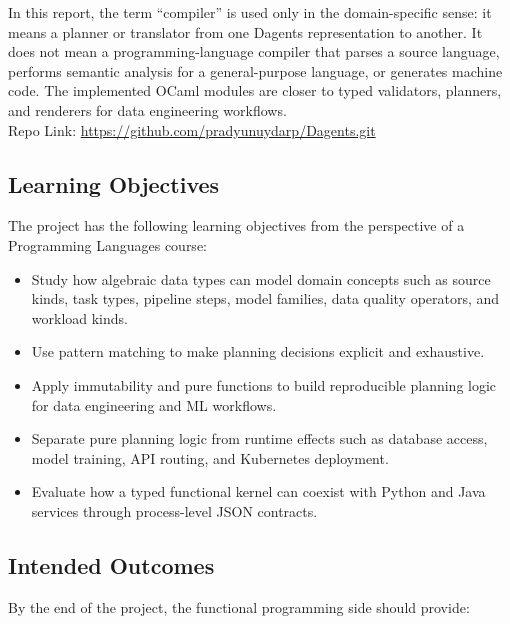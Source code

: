 \documentclass[conference]{IEEEtran}
\begin{document}
In this report, the term ``compiler'' is used only in the domain-specific sense:
it means a planner or translator from one Dagents representation to another.
It does not mean a programming-language compiler that parses a source language,
performs semantic analysis for a general-purpose language, or generates machine
code. The implemented OCaml modules are closer to typed validators, planners,
and renderers for data engineering workflows. \\

Repo Link: \url{https://github.com/pradyunuydarp/Dagents.git}

\subsection{Learning Objectives}

The project has the following learning objectives from the perspective of a
Programming Languages course:

\begin{itemize}
  \item Study how algebraic data types can model domain concepts such as source
  kinds, task types, pipeline steps, model families, data quality operators, and
  workload kinds.
  \item Use pattern matching to make planning decisions explicit and exhaustive.
  \item Apply immutability and pure functions to build reproducible planning
  logic for data engineering and ML workflows.
  \item Separate pure planning logic from runtime effects such as database
  access, model training, API routing, and Kubernetes deployment.
  \item Evaluate how a typed functional kernel can coexist with Python and Java
  services through process-level JSON contracts.
\end{itemize}

\subsection{Intended Outcomes}

By the end of the project, the functional programming side should provide:
\end{document}
